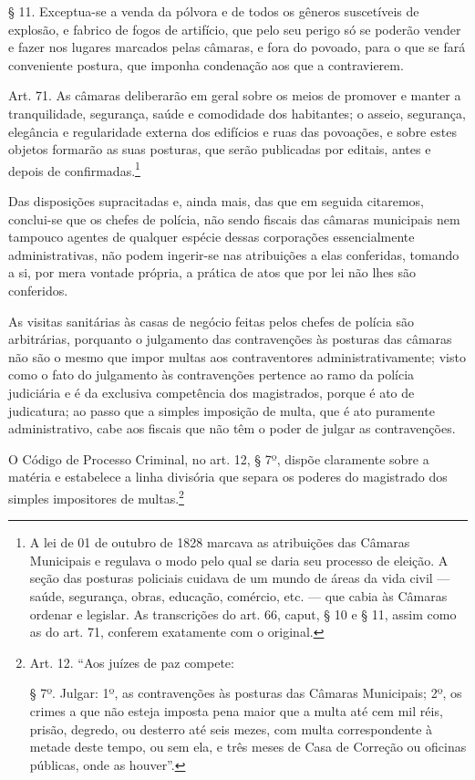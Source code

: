 § 11. Exceptua-se a venda da pólvora e de todos os gêneros suscetíveis
de explosão, e fabrico de fogos de artifício, que pelo seu perigo só se
poderão vender e fazer nos lugares marcados pelas câmaras, e fora do
povoado, para o que se fará conveniente postura, que imponha condenação
aos que a contravierem.

Art. 71. As câmaras deliberarão em geral sobre os meios de promover e
manter a tranquilidade, segurança, saúde e comodidade dos habitantes; o
asseio, segurança, elegância e regularidade externa dos edifícios e ruas
das povoações, e sobre estes objetos formarão as suas posturas, que
serão publicadas por editais, antes e depois de confirmadas.\footnote{
  A lei de 01 de outubro de 1828 marcava as atribuições das Câmaras Municipais e
  regulava o modo pelo qual se daria seu processo de eleição. A seção
  das posturas policiais cuidava de um mundo de áreas da vida civil ---
  saúde, segurança, obras, educação, comércio, etc. --- que cabia às
  Câmaras ordenar e legislar. As transcrições do art. 66, caput, § 10 e
  § 11, assim como as do art. 71, conferem exatamente com o original.}

Das disposições supracitadas e, ainda mais, das que em seguida
citaremos, conclui-se que os chefes de polícia, não sendo fiscais das
câmaras municipais nem tampouco agentes de qualquer espécie dessas
corporações essencialmente administrativas, não podem ingerir-se nas
atribuições a elas conferidas, tomando a si, por mera vontade própria, a
prática de atos que por lei não lhes são conferidos.

As visitas sanitárias às casas de negócio feitas pelos chefes de polícia
são arbitrárias, porquanto o julgamento das contravenções às posturas
das câmaras não são o mesmo que impor multas aos contraventores
administrativamente; visto como o fato do julgamento às contravenções
pertence ao ramo da polícia judiciária e é da exclusiva competência dos
magistrados, porque é ato de judicatura; ao passo que a simples
imposição de multa, que é ato puramente administrativo, cabe aos fiscais
que não têm o poder de julgar as contravenções.

O Código de Processo Criminal, no art. 12, § 7º, dispõe claramente sobre
a matéria e estabelece a linha divisória que separa os poderes do
magistrado dos simples impositores de multas.\footnote{Art. 12. ``Aos
  juízes de paz compete:

  § 7º. Julgar: 1º, as contravenções às posturas das Câmaras Municipais;
  2º, os crimes a que não esteja imposta pena maior que a multa até cem
  mil réis, prisão, degredo, ou desterro até seis mezes, com multa
  correspondente à metade deste tempo, ou sem ela, e três meses de Casa
  de Correção ou oficinas públicas, onde as houver''.}


